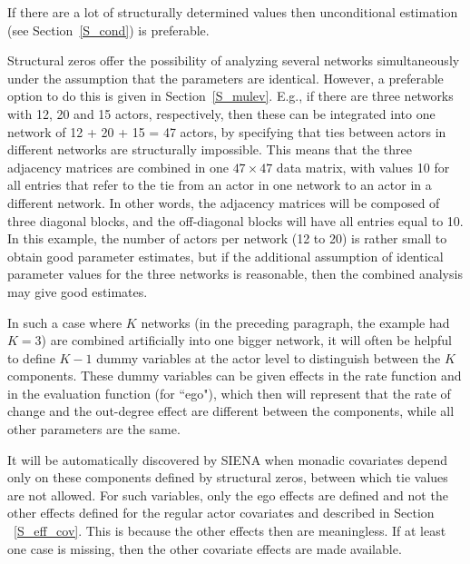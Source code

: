 \documentclass[a4paper,fleqn,11pt]{article}
\newcommand{\+}{\, + \,}
\newcommand{\SI}{{\sf SIENA }}
\begin{document}
If there are a lot of structurally determined values
then unconditional estimation  (see Section~\ref{S_cond})
is preferable.

Structural zeros offer the possibility of analyzing several
networks simultaneously under the assumption that the parameters
are identical.
However, a preferable option to do this is given in Section~\ref{S_mulev}.
E.g., if there are three networks with 12, 20 and
15 actors, respectively, then these can be integrated into one
network of 12 + 20 + 15 = 47 actors, by specifying that ties
between actors in different networks are structurally impossible.
This means that the three adjacency matrices are combined in one
$47 \times 47$ data matrix, with values 10 for all entries that
refer to the tie from an actor in one network to an actor in a
different network. In other words, the adjacency matrices will be
composed of three diagonal blocks, and the off-diagonal blocks
will have all entries equal to 10. In this example, the number of
actors per network (12 to 20) is rather small to obtain good
parameter estimates, but if the additional assumption of identical
parameter values for the three networks is reasonable, then the
combined analysis may give good estimates.

In such a case where $K$ networks (in the preceding paragraph, the
example had $K = 3$) are combined artificially into one bigger
network, it will often be helpful to define $K-1$ dummy variables
at the actor level to distinguish between the $K$ components.
These dummy variables can be given effects in the rate function
and in the evaluation function (for ``ego"), which then will
represent that the rate of change and the out-degree effect are
different between the components, while all other parameters are
the same.

It will be automatically discovered by \SI when monadic covariates
depend only on these components defined by structural zeros,
between which tie values are not allowed.
For such variables, only the ego effects are defined
and not the other effects defined for the regular
actor covariates and described in Section ~\ref{S_eff_cov}.
This is because the other effects then are meaningless.
If at least one case is missing,
then the other covariate effects are made available.
\end{document}
